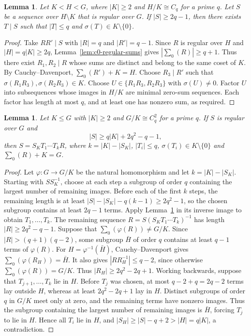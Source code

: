 \documentclass[10pt,a4paper]{amsart}
\newtheorem{lem}[thm]{Lemma}
\theoremstyle{definition}
\theoremstyle{remark}
\numberwithin{equation}{section}
\begin{document}
\begin{lem}\label{lem:c0-short-block}
Let $K<H<G$, where $|K|\ge2$ and $H/K\cong C_q$ for a prime $q$.
Let $S$ be a sequence over $H\setminus K$ that is regular over $G$.
If $|S|\ge2q-1$, then there exists $T\mid S$ such that
$|T|\le q$ and $\sigma(T)\in K\setminus\{0\}$.
\end{lem}

\begin{proof}
Take $RR'\mid S$ with $|R|=q$ and $|R'|=q-1$.
Since $R$ is regular over $H$ and $|H|=q|K|\ge2q$,
Lemma~\ref{lem:c0-regular-sums} gives $|\sum_0(R)|\ge q+1$.
Thus there exist $R_1,R_2\mid R$ whose sums are distinct and belong to the same coset of $K$.
By Cauchy--Davenport, $\sum_0(R')+K=H$.
Choose $R_3\mid R'$ such that $\sigma(R_1R_3),\sigma(R_2R_3)\in K$.
Choose $U\in\{R_1R_3,R_2R_3\}$ with $\sigma(U)\ne0$.
Factor $U$ into subsequences whose images in $H/K$ are minimal zero-sum sequences.
Each factor has length at most $q$, and at least one has nonzero sum, as required.
\end{proof}

\begin{lem}\label{lem:c0-decomposition}
Let $K\le G$ with $|K|\ge2$ and $G/K\cong C_q^2$ for a prime $q$.
If $S$ is regular over $G$ and
\[
|S|\ge q|K|+2q^2-q-1,
\]
then $S=S_KT_1\cdots T_kR$, where $k=|K|-|S_K|$,
$|T_i|\le q$, $\sigma(T_i)\in K\setminus\{0\}$ and $\sum_0(R)+K=G$.
\end{lem}

\begin{proof}
Let $\varphi:G\to G/K$ be the natural homomorphism and let $k=|K|-|S_K|$.
Starting with $SS_K^{-1}$, choose at each step a subgroup of order $q$ containing the largest number of remaining images.
Before each of the first $k$ steps, the remaining length is at least
$|S|-|S_K|-q(k-1)\ge2q^2-1$, so the chosen subgroup contains at least $2q-1$ terms.
Apply Lemma~\ref{lem:c0-short-block} in its inverse image to obtain $T_1,\ldots,T_k$.
The remaining sequence $R=S(S_KT_1\cdots T_k)^{-1}$ has length
$|R|\ge2q^2-q-1$.
Suppose that $\sum_0(\varphi(R))\ne G/K$.
Since $|R|>(q+1)(q-2)$, some subgroup $\bar H$ of order $q$ contains at least $q-1$ terms of $\varphi(R)$.
For $H=\varphi^{-1}(\bar H)$, Cauchy--Davenport gives $\sum_0(\varphi(R_H))=\bar H$.
It also gives $|RR_H^{-1}|\le q-2$, since otherwise $\sum_0(\varphi(R))=G/K$.
Thus $|R_H|\ge2q^2-2q+1$.
Working backwards, suppose that $T_{j+1},\ldots,T_k$ lie in $H$.
Before $T_j$ was chosen, at most $q-2+q=2q-2$ terms lay outside $H$,
whereas at least $2q^2-2q+1$ lay in $H$.
Distinct subgroups of order $q$ in $G/K$ meet only at zero,
and the remaining terms have nonzero images. Thus the subgroup containing
the largest number of remaining images is $\bar H$, forcing $T_j$ to lie in $H$.
Hence all $T_i$ lie in $H$, and $|S_H|\ge|S|-q+2>|H|=q|K|$, a contradiction.
\end{proof}
\end{document}
